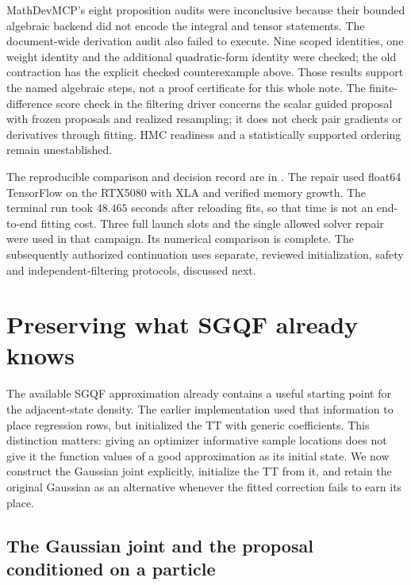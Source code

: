 \documentclass[11pt]{article}
\begin{document}
MathDevMCP's eight proposition audits were inconclusive because their bounded
algebraic backend did not encode the integral and tensor statements. The
document-wide derivation audit also failed to execute. Nine scoped identities,
one weight identity and the additional quadratic-form identity were checked;
the old contraction has the explicit checked counterexample above. Those
results support the named algebraic steps, not a proof certificate for this
whole note. The finite-difference score check in the filtering driver concerns
the scalar guided proposal with frozen proposals and realized resampling;
it does not check pair gradients or derivatives through fitting. HMC
readiness and a statistically supported ordering remain unestablished.

The reproducible comparison and decision record are in
{\def\UrlBreaks{\do\/\do\-\do\_}%
}.
The repair used float64 TensorFlow on the RTX5080 with XLA and verified
memory growth. The terminal run took $48.465$ seconds after reloading fits,
so that time is not an end-to-end fitting cost. Three full launch slots and
the single allowed solver repair were used in that campaign. Its numerical
comparison is complete. The subsequently authorized continuation uses separate,
reviewed initialization, safety and independent-filtering protocols, discussed
next.

\clearpage
\section{Preserving what SGQF already knows}
\label{sec:sgqf-preservation}

The available SGQF approximation already contains a useful starting point for
the adjacent-state density. The earlier implementation used that information
to place regression rows, but initialized the TT with generic coefficients.
This distinction matters: giving an optimizer informative sample locations
does not give it the function values of a good approximation as its initial
state. We now construct the Gaussian joint explicitly, initialize the TT from
it, and retain the original Gaussian as an alternative whenever the fitted
correction fails to earn its place.

\subsection{The Gaussian joint and the proposal conditioned on a particle}
\end{document}
